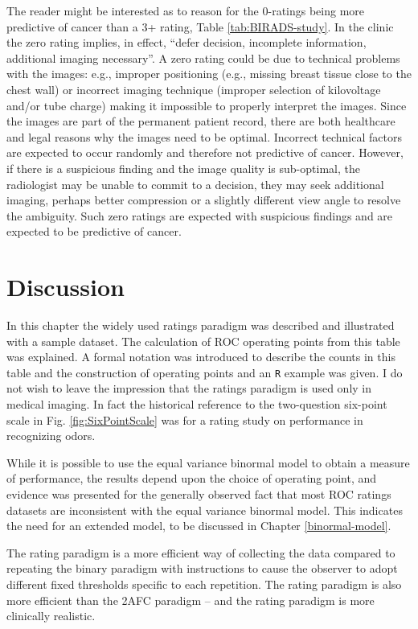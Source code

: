 \documentclass[
]{book}
\begin{document}
The reader might be interested as to reason for the 0-ratings being more predictive of cancer than a 3+ rating, Table \ref{tab:BIRADS-study}. In the clinic the zero rating implies, in effect, ``defer decision, incomplete information, additional imaging necessary''. A zero rating could be due to technical problems with the images: e.g., improper positioning (e.g., missing breast tissue close to the chest wall) or incorrect imaging technique (improper selection of kilovoltage and/or tube charge) making it impossible to properly interpret the images. Since the images are part of the permanent patient record, there are both healthcare and legal reasons why the images need to be optimal. Incorrect technical factors are expected to occur randomly and therefore not predictive of cancer. However, if there is a suspicious finding and the image quality is sub-optimal, the radiologist may be unable to commit to a decision, they may seek additional imaging, perhaps better compression or a slightly different view angle to resolve the ambiguity. Such zero ratings are expected with suspicious findings and are expected to be predictive of cancer.

\hypertarget{ratings-paradigm-discussion}{%
\section{Discussion}\label{ratings-paradigm-discussion}}

In this chapter the widely used ratings paradigm was described and illustrated with a sample dataset. The calculation of ROC operating points from this table was explained. A formal notation was introduced to describe the counts in this table and the construction of operating points and an \texttt{R} example was given. I do not wish to leave the impression that the ratings paradigm is used only in medical imaging. In fact the historical reference \citep{macmillan2004detection} to the two-question six-point scale in Fig. \ref{fig:SixPointScale} was for a rating study on performance in recognizing odors.

While it is possible to use the equal variance binormal model to obtain a measure of performance, the results depend upon the choice of operating point, and evidence was presented for the generally observed fact that most ROC ratings datasets are inconsistent with the equal variance binormal model. This indicates the need for an extended model, to be discussed in Chapter \ref{binormal-model}.

The rating paradigm is a more efficient way of collecting the data compared to repeating the binary paradigm with instructions to cause the observer to adopt different fixed thresholds specific to each repetition. The rating paradigm is also more efficient than the 2AFC paradigm -- and the rating paradigm is more clinically realistic.
\end{document}
